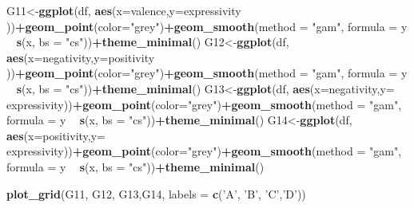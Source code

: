 \documentclass[
]{book}
\newenvironment{Shaded}{\begin{snugshade}}{\end{snugshade}}
\newcommand{\DataTypeTok}[1]{\textcolor[rgb]{0.13,0.29,0.53}{#1}}
\newcommand{\KeywordTok}[1]{\textcolor[rgb]{0.13,0.29,0.53}{\textbf{#1}}}
\newcommand{\NormalTok}[1]{#1}
\newcommand{\OperatorTok}[1]{\textcolor[rgb]{0.81,0.36,0.00}{\textbf{#1}}}
\newcommand{\StringTok}[1]{\textcolor[rgb]{0.31,0.60,0.02}{#1}}
\begin{document}
\begin{Shaded}
\begin{Highlighting}[]
\NormalTok{G11<-}\KeywordTok{ggplot}\NormalTok{(df, }\KeywordTok{aes}\NormalTok{(}\DataTypeTok{x=}\NormalTok{valence,}\DataTypeTok{y=}\NormalTok{expressivity ))}\OperatorTok{+}\KeywordTok{geom_point}\NormalTok{(}\DataTypeTok{color=}\StringTok{"grey"}\NormalTok{)}\OperatorTok{+}\KeywordTok{geom_smooth}\NormalTok{(}\DataTypeTok{method =} \StringTok{"gam"}\NormalTok{, }\DataTypeTok{formula =}\NormalTok{ y }\OperatorTok{~}\StringTok{ }\KeywordTok{s}\NormalTok{(x, }\DataTypeTok{bs =} \StringTok{"cs"}\NormalTok{))}\OperatorTok{+}\KeywordTok{theme_minimal}\NormalTok{()}
\NormalTok{G12<-}\KeywordTok{ggplot}\NormalTok{(df, }\KeywordTok{aes}\NormalTok{(}\DataTypeTok{x=}\NormalTok{negativity,}\DataTypeTok{y=}\NormalTok{positivity ))}\OperatorTok{+}\KeywordTok{geom_point}\NormalTok{(}\DataTypeTok{color=}\StringTok{"grey"}\NormalTok{)}\OperatorTok{+}\KeywordTok{geom_smooth}\NormalTok{(}\DataTypeTok{method =} \StringTok{"gam"}\NormalTok{, }\DataTypeTok{formula =}\NormalTok{ y }\OperatorTok{~}\StringTok{ }\KeywordTok{s}\NormalTok{(x, }\DataTypeTok{bs =} \StringTok{"cs"}\NormalTok{))}\OperatorTok{+}\KeywordTok{theme_minimal}\NormalTok{()}
\NormalTok{G13<-}\KeywordTok{ggplot}\NormalTok{(df, }\KeywordTok{aes}\NormalTok{(}\DataTypeTok{x=}\NormalTok{negativity,}\DataTypeTok{y=}\NormalTok{ expressivity))}\OperatorTok{+}\KeywordTok{geom_point}\NormalTok{(}\DataTypeTok{color=}\StringTok{"grey"}\NormalTok{)}\OperatorTok{+}\KeywordTok{geom_smooth}\NormalTok{(}\DataTypeTok{method =} \StringTok{"gam"}\NormalTok{, }\DataTypeTok{formula =}\NormalTok{ y }\OperatorTok{~}\StringTok{ }\KeywordTok{s}\NormalTok{(x, }\DataTypeTok{bs =} \StringTok{"cs"}\NormalTok{))}\OperatorTok{+}\KeywordTok{theme_minimal}\NormalTok{()}
\NormalTok{G14<-}\KeywordTok{ggplot}\NormalTok{(df, }\KeywordTok{aes}\NormalTok{(}\DataTypeTok{x=}\NormalTok{positivity,}\DataTypeTok{y=}\NormalTok{ expressivity))}\OperatorTok{+}\KeywordTok{geom_point}\NormalTok{(}\DataTypeTok{color=}\StringTok{"grey"}\NormalTok{)}\OperatorTok{+}\KeywordTok{geom_smooth}\NormalTok{(}\DataTypeTok{method =} \StringTok{"gam"}\NormalTok{, }\DataTypeTok{formula =}\NormalTok{ y }\OperatorTok{~}\StringTok{ }\KeywordTok{s}\NormalTok{(x, }\DataTypeTok{bs =} \StringTok{"cs"}\NormalTok{))}\OperatorTok{+}\KeywordTok{theme_minimal}\NormalTok{()}

\KeywordTok{plot_grid}\NormalTok{(G11, G12, G13,G14, }\DataTypeTok{labels =} \KeywordTok{c}\NormalTok{(}\StringTok{'A'}\NormalTok{, }\StringTok{'B'}\NormalTok{, }\StringTok{'C'}\NormalTok{,}\StringTok{'D'}\NormalTok{))}
\end{Highlighting}
\end{Shaded}
\end{document}
